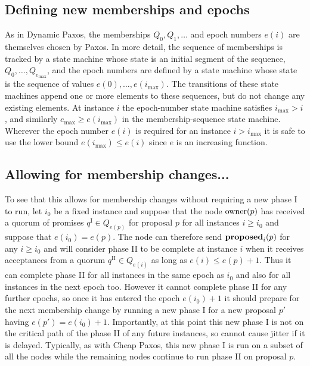\documentclass[journal]{IEEEtran}
\begin{document}
\subsection{Defining new memberships and epochs}

As in Dynamic Paxos, the memberships $Q_0, Q_1, \ldots$ and epoch numbers
$e(i)$ are themselves chosen by Paxos. In more detail, the sequence of
memberships is tracked by a state machine whose state is an initial segment of
the sequence, $Q_0, \ldots, Q_{e_\mathrm{max}}$, and the epoch numbers are
defined by a state machine whose state is the sequence of values $e(0), \ldots,
e(i_\mathrm{max})$. The transitions of these state machines append one or more
elements to these sequences, but do not change any existing elements.  At
instance $i$ the epoch-number state machine satisfies $i_\mathrm{max} > i$, and
similarly $e_\mathrm{max} \ge e(i_\mathrm{max})$ in the membership-sequence
state machine.  Wherever the epoch number $e(i)$ is required for an instance $i
> i_\mathrm{max}$ it is safe to use the lower bound $e(i_\mathrm{max}) \le
e(i)$ since $e$ is an increasing function.

\subsection{Allowing for membership changes...}

To see that this allows for membership changes without requiring a new phase I
to run, let $i_0$ be a fixed instance and suppose that the node $\mathrm{owner}(p)$ has
received a quorum of promises $q^\textrm{I} \in Q_{e(p)}$ for proposal $p$ for
all instances $i \ge i_0$ and suppose that $e(i_0) = e(p)$. The node can
therefore send $\mathbf{proposed}_{i}(p)$ for any $i \ge i_0$ and will consider phase II to
be complete at instance $i$ when it receives acceptances from a quorum
$q^\textrm{II} \in Q_{e(i)}$ as long as $e(i) \le e(p) + 1$. Thus it can
complete phase II for all instances in the same epoch as $i_0$ and also for all
instances in the next epoch too.  However it cannot complete phase II for any
further epochs, so once it has entered the epoch $e(i_0) + 1$ it should prepare
for the next membership change by running a new phase I for a new proposal $p'$
having $e(p') = e(i_0) + 1$. Importantly, at this point this new phase I is not
on the critical path of the phase II of any future instances, so cannot cause
jitter if it is delayed. Typically, as with Cheap Paxos, this new phase I is
run on a subset of all the nodes while the remaining nodes continue to run
phase II on proposal $p$.
\end{document}
